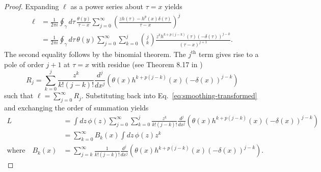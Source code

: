 \begin{proof}
Expanding $\ell$ as a power series about $\tau=x$ yields
\begin{align*}
\ell & =\frac{1}{2\pi i}\oint_{\gamma}d\tau\,\frac{\theta\left(y\right)}{\tau-x}\sum_{j=0}^{\infty}\left(\frac{zh\left(\tau\right)-h^{p}\left(x\right)\delta\left(\tau\right)}{\tau-x}\right)^{j}\\
 & =\frac{1}{2\pi i}\oint_{\gamma}d\tau\,\theta\left(y\right)\sum_{j=0}^{\infty}\sum_{k=0}^{j}\binom{j}{k}\frac{z^{k}h^{k+p\left(j-k\right)}\left(\tau\right)\left(-\delta\left(\tau\right)\right)^{j-k}}{\left(\tau-x\right)^{j+1}}.
\end{align*}
The second equality follows by the binomial theorem. The $j^{\text{th}}$ term gives rise to a pole of order $j+1$ at $\tau=x$ with residue (see Theorem 8.17 in \citet{Howie2008})
\[
R_{j}=\sum_{k=0}^{j}\frac{z^{k}}{k!\left(j-k\right)!}\frac{d^{j}}{dx^{j}}\left(\theta\left(x\right)h^{k+p\left(j-k\right)}\left(x\right)\left(-\delta\left(x\right)\right)^{j-k}\right)
\]
such that $\ell=\sum_{j=0}^{\infty}R_{j}$. Substituting back into Eq.~\eqref{eq:smoothing-transformed} and exchanging the order of summation yields
\begin{align*}
L & =\int dz\,\phi\left(z\right)\sum_{j=0}^{\infty}\sum_{k=0}^{j}\frac{z^{k}}{k!\left(j-k\right)!}\frac{d^{j}}{dx^{j}}\left(\theta\left(x\right)h^{k+p\left(j-k\right)}\left(x\right)\left(-\delta\left(x\right)\right)^{j-k}\right)\\
 & =\sum_{k=0}^{\infty}B_{k}\left(x\right)\int dz\,\phi\left(z\right)z^{k}\\
\text{where}\quad B_{k}\left(x\right) & =\sum_{j=k}^{\infty}\frac{1}{k!\left(j-k\right)!}\frac{d^{j}}{dx^{j}}\left(\theta\left(x\right)h^{k+p\left(j-k\right)}\left(x\right)\left(-\delta\left(x\right)\right)^{j-k}\right).
\end{align*}

\end{proof}


